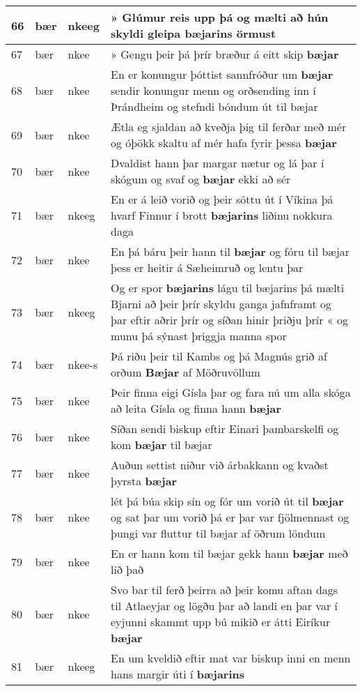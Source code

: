 \documentclass{article}
\begin{document}
\begin{longtable}{p{1cm}|p{1cm}|p{1cm}|p{13cm}}
\hline
66&bær&nkeeg&» Glúmur reis upp þá og mælti að hún skyldi gleipa \textbf{bæjarins} örmust\\
\hline
67&bær&nkee&» Gengu þeir þá þrír bræður á eitt skip \textbf{bæjar} \\
\hline
68&bær&nkee&En er konungur þóttist sannfróður um \textbf{bæjar} sendir konungur menn og orðsending inn í Þrándheim og stefndi bóndum út til bæjar\\
\hline
69&bær&nkee&Ætla eg sjaldan að kveðja þig til ferðar með mér og óþökk skaltu af mér hafa fyrir þessa \textbf{bæjar} \\
\hline
70&bær&nkee&Dvaldist hann þar margar nætur og lá þar í skógum og svaf og \textbf{bæjar} ekki að sér\\
\hline
71&bær&nkeeg&En er á leið vorið og þeir sóttu út í Víkina þá hvarf Finnur í brott \textbf{bæjarins} liðinu nokkura daga\\
\hline
72&bær&nkee&En þá báru þeir hann til \textbf{bæjar} og fóru til bæjar þess er heitir á Sæheimruð og lentu þar\\
\hline
73&bær&nkeeg&Og er spor \textbf{bæjarins} lágu til bæjarins þá mælti Bjarni að þeir þrír skyldu ganga jafnframt og þar eftir aðrir þrír og síðan hinir þriðju þrír « og munu þá sýnast þriggja manna spor\\
\hline
74&bær&nkee-s&Þá riðu þeir til Kambs og þá Magnús grið af orðum \textbf{Bæjar} af Möðruvöllum\\
\hline
75&bær&nkee&Þeir finna eigi Gísla þar og fara nú um alla skóga að leita Gísla og finna hann \textbf{bæjar} \\
\hline
76&bær&nkee&Síðan sendi biskup eftir Einari þambarskelfi og kom \textbf{bæjar} til bæjar\\
\hline
77&bær&nkee&Auðun settist niður við árbakkann og kvaðst þyrsta \textbf{bæjar} \\
\hline
78&bær&nkee&lét þá búa skip sín og fór um vorið út til \textbf{bæjar} og sat þar um vorið þá er þar var fjölmennast og þungi var fluttur til bæjar af öðrum löndum\\
\hline
79&bær&nkee&En er hann kom til bæjar gekk hann \textbf{bæjar} með lið það\\
\hline
80&bær&nkee&Svo bar til ferð þeirra að þeir komu aftan dags til Atlaeyjar og lögðu þar að landi en þar var í eyjunni skammt upp bú mikið er átti Eiríkur \textbf{bæjar} \\
\hline
81&bær&nkeeg&En um kveldið eftir mat var biskup inni en menn hans margir úti í \textbf{bæjarins} \\

\end{longtable}
\end{document}
